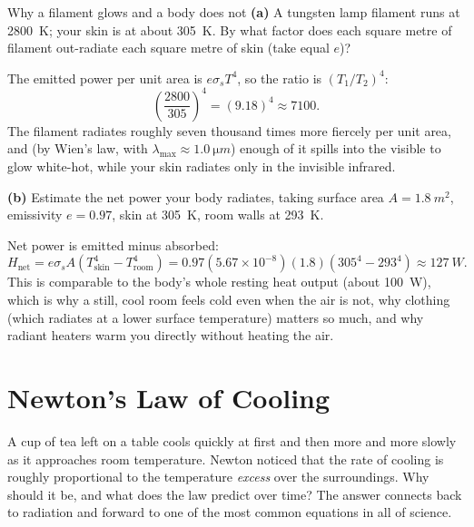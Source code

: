 \begin{exbox}{Why a filament glows and a body does not}\label{ex:radiation}
\textbf{(a)} A tungsten lamp filament runs at \SI{2800}{K}; your skin is at about \SI{305}{K}. By what
factor does each square metre of filament out-radiate each square metre of skin (take equal $e$)?

 The emitted power per unit area is $e\sigma_{\!s}T^4$, so the ratio is $(T_1/T_2)^4$:
\[
\left(\frac{2800}{305}\right)^{\!4} = (9.18)^4 \approx 7100 .
\]
The filament radiates roughly seven thousand times more fiercely per unit area, and (by Wien's law,
with $\lambda_{\max}\approx\SI{1.0}{\micro m}$) enough of it spills into the visible to glow white-hot,
while your skin radiates only in the invisible infrared.

\textbf{(b)} Estimate the net power your body radiates, taking surface area $A=\SI{1.8}{m^2}$,
emissivity $e=0.97$, skin at \SI{305}{K}, room walls at \SI{293}{K}.

 Net power is emitted minus absorbed:
\[
H_{\text{net}} = e\sigma_{\!s}A\left(T_{\text{skin}}^4 - T_{\text{room}}^4\right)
  = 0.97(5.67\times10^{-8})(1.8)\left(305^4 - 293^4\right) \approx \SI{127}{W}.
\]
This is comparable to the body's whole resting heat output (about \SI{100}{W}), which is why a still,
cool room feels cold even when the air is not, why clothing (which radiates at a lower surface
temperature) matters so much, and why radiant heaters warm you directly without heating the air.
\end{exbox}

\section{Newton's Law of Cooling}\label{sec:cooling}

A cup of tea left on a table cools quickly at first and then more and more slowly as it approaches room
temperature. Newton noticed that the rate of cooling is roughly proportional to the temperature
\emph{excess} over the surroundings. Why should it be, and what does the law predict over time? The
answer connects back to radiation and forward to one of the most common equations in all of science.

